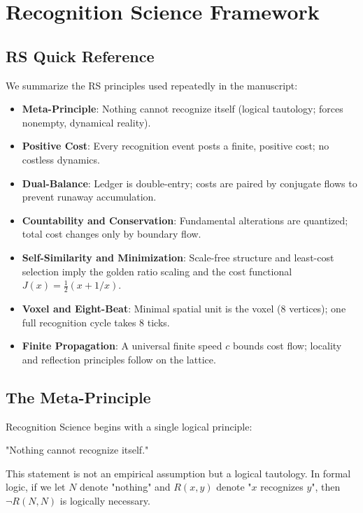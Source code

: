 \documentclass[11pt]{amsart}
\begin{document}
\section{Recognition Science Framework}
\subsection{RS Quick Reference}
We summarize the RS principles used repeatedly in the manuscript:
\begin{itemize}
  \item \textbf{Meta-Principle}: Nothing cannot recognize itself (logical tautology; forces nonempty, dynamical reality).
  \item \textbf{Positive Cost}: Every recognition event posts a finite, positive cost; no costless dynamics.
  \item \textbf{Dual-Balance}: Ledger is double-entry; costs are paired by conjugate flows to prevent runaway accumulation.
  \item \textbf{Countability and Conservation}: Fundamental alterations are quantized; total cost changes only by boundary flow.
  \item \textbf{Self-Similarity and Minimization}: Scale-free structure and least-cost selection imply the golden ratio scaling and the cost functional $J(x)=\tfrac12(x+1/x)$.
  \item \textbf{Voxel and Eight-Beat}: Minimal spatial unit is the voxel (8 vertices); one full recognition cycle takes 8 ticks.
  \item \textbf{Finite Propagation}: A universal finite speed $c$ bounds cost flow; locality and reflection principles follow on the lattice.
\end{itemize}

\subsection{The Meta-Principle}

Recognition Science begins with a single logical principle:

\begin{principle}
"Nothing cannot recognize itself."
\end{principle}

This statement is not an empirical assumption but a logical tautology. In formal logic, if we let $N$ denote "nothing" and $R(x,y)$ denote "$x$ recognizes $y$", then $\neg R(N,N)$ is logically necessary.
\end{document}
